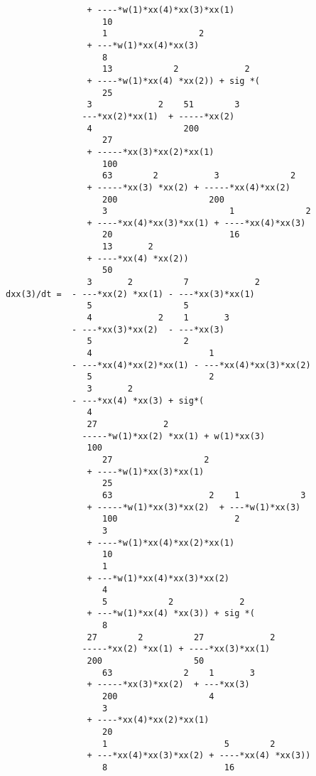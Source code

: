 \documentclass[11pt,a5paper]{article}
\begin{document}
\begin{verbatim}
                + ----*w(1)*xx(4)*xx(3)*xx(1)
                   10
                   1                  2
                + ---*w(1)*xx(4)*xx(3)
                   8
                   13            2             2
                + ----*w(1)*xx(4) *xx(2)) + sig *(
                   25
                3             2    51        3
               ---*xx(2)*xx(1)  + -----*xx(2)
                4                  200
                   27
                + -----*xx(3)*xx(2)*xx(1)
                   100
                   63        2           3              2
                + -----*xx(3) *xx(2) + -----*xx(4)*xx(2)
                   200                  200
                   3                        1              2
                + ----*xx(4)*xx(3)*xx(1) + ----*xx(4)*xx(3)
                   20                       16
                   13       2
                + ----*xx(4) *xx(2))
                   50
                3       2          7             2
dxx(3)/dt =  - ---*xx(2) *xx(1) - ---*xx(3)*xx(1)
                5                  5
                4             2    1       3
             - ---*xx(3)*xx(2)  - ---*xx(3)
                5                  2
                4                       1
             - ---*xx(4)*xx(2)*xx(1) - ---*xx(4)*xx(3)*xx(2)
                5                       2
                3       2
             - ---*xx(4) *xx(3) + sig*(
                4
                27             2
               -----*w(1)*xx(2) *xx(1) + w(1)*xx(3)
                100
                   27                  2
                + ----*w(1)*xx(3)*xx(1)
                   25
                   63                   2    1            3
                + -----*w(1)*xx(3)*xx(2)  + ---*w(1)*xx(3)
                   100                       2
                   3
                + ----*w(1)*xx(4)*xx(2)*xx(1)
                   10
                   1
                + ---*w(1)*xx(4)*xx(3)*xx(2)
                   4
                   5            2             2
                + ---*w(1)*xx(4) *xx(3)) + sig *(
                   8
                27        2          27             2
               -----*xx(2) *xx(1) + ----*xx(3)*xx(1)
                200                  50
                   63              2    1       3
                + -----*xx(3)*xx(2)  + ---*xx(3)
                   200                  4
                   3
                + ----*xx(4)*xx(2)*xx(1)
                   20
                   1                       5        2
                + ---*xx(4)*xx(3)*xx(2) + ----*xx(4) *xx(3))
                   8                       16

\end{verbatim}
\end{document}
